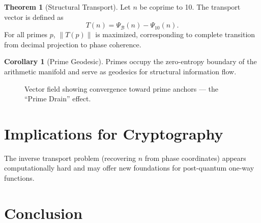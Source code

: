 \documentclass[11pt,a4paper]{article}
\theoremstyle{definition}
\newtheorem{theorem}{Theorem}[section]
\newtheorem{corollary}{Corollary}[section]
\begin{document}
\begin{theorem}[Structural Transport]
Let \( n \) be coprime to 10. The transport vector is defined as
\[ T(n) = \Psi_{\mathcal{B}}(n) - \Psi_{10}(n). \]
For all primes \( p \), \( \|T(p)\| \) is maximized, corresponding to complete transition from decimal projection to phase coherence.
\end{theorem}

\begin{corollary}[Prime Geodesic]
Primes occupy the zero-entropy boundary of the arithmetic manifold and serve as geodesics for structural information flow.
\end{corollary}

\begin{figure}[htbp]
\centering
{}
\caption{Vector field showing convergence toward prime anchors — the ``Prime Drain'' effect.}
\label{fig:drain}
\end{figure}

\section{Implications for Cryptography}

The inverse transport problem (recovering \( n \) from phase coordinates) appears computationally hard and may offer new foundations for post-quantum one-way functions.

\section{Conclusion}
\end{document}
